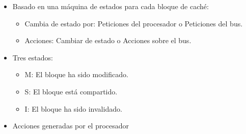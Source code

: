 \documentclass[12pt, twoside, openright]{report} %
\begin{document}
\begin{itemize}
	\item Basado en una máquina de estados para cada bloque de caché:

	      \begin{itemize}

		      \item Cambia de estado por: Peticiones del procesador o Peticiones
		            del bus.
		      \item Acciones: Cambiar de estado o Acciones sobre el bus.
	      \end{itemize}
	\item Tres estados:

	      \begin{itemize}

		      \item M: El bloque ha sido modificado.
		      \item S: El bloque está compartido.
		      \item I: El bloque ha sido invalidado.
	      \end{itemize}
	      \pagebreak
	\item Acciones generadas por el procesador


\end{itemize}
\end{document}
